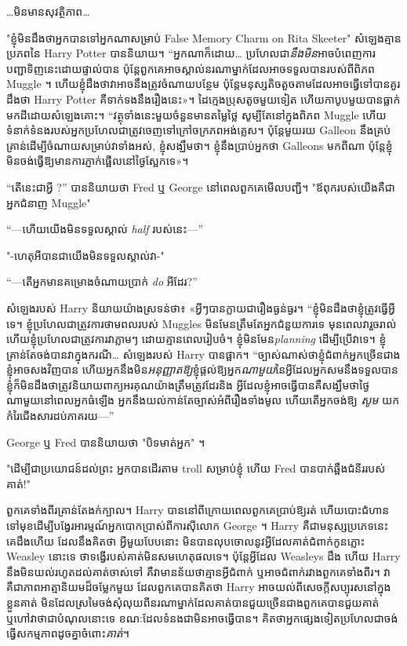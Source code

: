 …មិនមានសុវត្ថិភាព…

"ខ្ញុំមិនដឹងថាអ្នកបានទៅអ្នកណាសម្រាប់ False Memory Charm on Rita Skeeter" សំឡេងគ្មានប្រភពនៃ Harry Potter បាននិយាយ។ “អ្នកណាក៏ដោយ… ប្រហែលជា\emph{នឹងមិន}អាចបំពេញការបញ្ជាទិញនេះដោយផ្ទាល់បាន ប៉ុន្តែពួកគេអាចស្គាល់នរណាម្នាក់ដែលអាចទទួលបានរបស់ពីពិភព Muggle ។ ហើយ​ខ្ញុំ​ដឹង​ថា​វា​អាច​នឹង​ត្រូវ​ចំណាយ​បន្ថែម ប៉ុន្តែ​មនុស្ស​តិច​តួច​តាម​ដែល​អាច​ធ្វើ​ទៅ​បាន​គួរ​ដឹង​ថា Harry Potter គឺ​ទាក់ទង​នឹង​រឿង​នេះ»។ ដៃ​ក្មេង​ប្រុស​តូច​មួយ​ទៀត ហើយ​កាបូប​មួយ​បាន​ធ្លាក់​មក​ដី​ដោយ​សំឡេង​គោះ។ “វត្ថុទាំងនេះមួយចំនួនមានតម្លៃថ្លៃ សូម្បីតែនៅក្នុងពិភព Muggle ហើយទំនាក់ទំនងរបស់អ្នកប្រហែលជាត្រូវចេញទៅក្រៅចក្រភពអង់គ្លេស។ ប៉ុន្តែមួយរយ Galleon នឹងគ្រប់គ្រាន់ដើម្បីចំណាយសម្រាប់វាទាំងអស់, ខ្ញុំសង្ឃឹមថា។ ខ្ញុំនឹងប្រាប់អ្នកថា Galleons មកពីណា ប៉ុន្តែខ្ញុំមិនចង់ធ្វើឱ្យមានការភ្ញាក់ផ្អើលនៅថ្ងៃស្អែកទេ»។

“តើនេះជាអ្វី \emph{}?” បាននិយាយថា Fred ឬ George នៅពេលពួកគេមើលបញ្ជី។ "ឪពុករបស់យើងគឺជាអ្នកជំនាញ Muggle"

“—ហើយ​យើង​មិន​ទទួល​ស្គាល់ \emph{half} របស់​នេះ—”

"-ហេតុអីបានជាយើងមិនទទួលស្គាល់វា-"

“—តើ​អ្នក​មាន​គម្រោង​ចំណាយ​ប្រាក់ \emph{do} អី​ដែរ?”

សំឡេង​របស់ Harry និយាយ​យ៉ាង​ស្រទន់​ថា៖ «អ្វីៗ​បាន​ក្លាយ​ជា​រឿង​ធ្ងន់ធ្ងរ។ “ខ្ញុំ​មិន​ដឹង​ថា​ខ្ញុំ​ត្រូវ​ធ្វើ​អ្វី​ទេ។ ខ្ញុំប្រហែលជាត្រូវការថាមពលរបស់ Muggles មិនមែនត្រឹមតែអ្នកជំនួយការទេ មុនពេលវារួចរាល់ ហើយខ្ញុំប្រហែលជាត្រូវការវាភ្លាមៗ ដោយគ្មានពេលរៀបចំ។ ខ្ញុំមិនមែន\emph{planning} ដើម្បីប្រើវាទេ។ ខ្ញុំគ្រាន់តែចង់បានវាក្នុងករណី… សំឡេងរបស់ Harry បានផ្អាក។ “ច្បាស់ណាស់ថាខ្ញុំជំពាក់អ្នកច្រើនជាងខ្ញុំអាចសងវិញបាន ហើយអ្នកនឹងមិន\emph{អនុញ្ញាតឱ្យ}ខ្ញុំផ្តល់ឱ្យអ្នក\emph{ណាមួយ}នៃអ្វីដែលអ្នកសមនឹងទទួលបាន ខ្ញុំក៏មិនដឹងថាត្រូវនិយាយពាក្យអរគុណយ៉ាងត្រឹមត្រូវដែរនិង អ្វីដែលខ្ញុំអាចធ្វើបានគឺសង្ឃឹមថាថ្ងៃណាមួយនៅពេលអ្នកធំឡើង អ្នកនឹងយល់កាន់តែច្បាស់អំពីរឿងទាំងមូល ហើយតើអ្នកចង់ឱ្យ \emph{សូម} យកកំរៃជើងសារដប់ភាគរយ—”

George ឬ Fred បាននិយាយថា "បិទមាត់អ្នក" ។

"ដើម្បីជាប្រយោជន៍ដល់ព្រះ អ្នកបានដើរតាម troll សម្រាប់ខ្ញុំ ហើយ Fred បានបាក់ឆ្អឹងជំនីររបស់គាត់!"

ពួកគេទាំងពីរគ្រាន់តែងក់ក្បាល។ Harry បាន​នៅ​ពី​ក្រោយ​ពេល​ពួក​គេ​ប្រាប់​ឱ្យ​រត់ ហើយ​បោះ​ជំហាន​ទៅ​មុខ​ដើម្បី​បង្វែរ​អារម្មណ៍​អ្នក​បោក​ប្រាស់​ពី​ការ​ស៊ី​លោក George ។ Harry គឺជាមនុស្សប្រភេទនេះ គេដឹងហើយ ដែលនឹងគិតថា អ្វីមួយបែបនោះ មិនបានលុបចោលនូវអ្វីដែលគាត់ជំពាក់កូនភ្លោះ Weasley នោះទេ ថាទង្វើរបស់គាត់មិនសមហេតុផលទេ។ ប៉ុន្តែអ្វីដែល Weasleys ដឹង ហើយ Harry នឹងមិនយល់រហូតដល់គាត់ចាស់ទៅ គឺវាមានន័យថាគ្មានអ្វីជំពាក់ ឬអាចជំពាក់រវាងពួកគេទាំងពីរ។ វាគឺជាភាពអាត្មានិយមដ៏ចម្លែកមួយ ដែលពួកគេបានគិតថា Harry អាចយល់ពីសេចក្តីសប្បុរសនៅក្នុងខ្លួនគាត់ មិនដែលស្រមៃចង់សុំលុយពីនរណាម្នាក់ដែលគាត់បានជួយច្រើនជាងពួកគេបានជួយគាត់ ឬហៅវាថាជាបំណុលនោះទេ ខណៈដែលទំនងជាមិនអាចធ្វើបាន។ គិតថាអ្នកផ្សេងទៀតប្រហែលជាចង់ធ្វើសកម្មភាពដូចគ្នាចំពោះ\emph{គាត់}។

